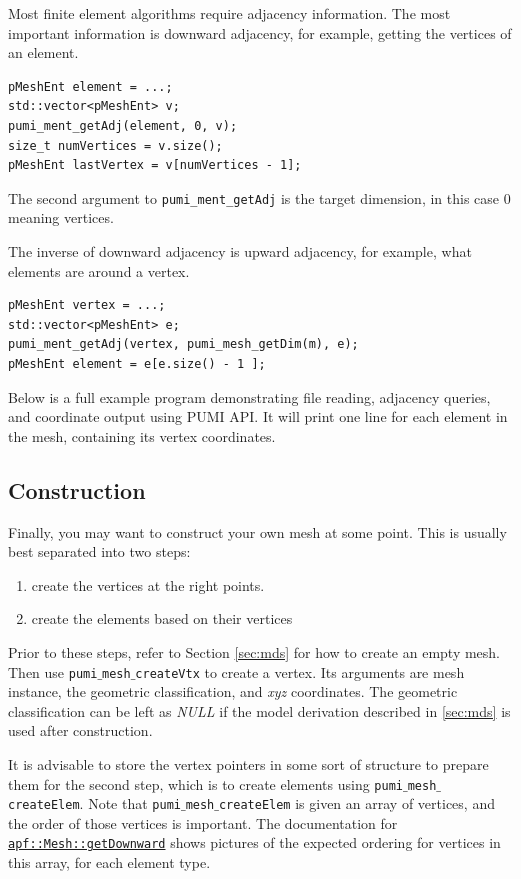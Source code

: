\documentclass{article}
\begin{document}
Most finite element algorithms require adjacency information.
The most important information is downward adjacency, for
example, getting the vertices of an element.

\begin{lstlisting}
pMeshEnt element = ...;
std::vector<pMeshEnt> v;
pumi_ment_getAdj(element, 0, v);
size_t numVertices = v.size();
pMeshEnt lastVertex = v[numVertices - 1];
\end{lstlisting}

The second argument to {\texttt{pumi\_ment\_getAdj}}
is the target dimension, in this case 0 meaning vertices.

The inverse of downward adjacency is upward adjacency,
for example, what elements are around a vertex.

\begin{lstlisting}
pMeshEnt vertex = ...;
std::vector<pMeshEnt> e;
pumi_ment_getAdj(vertex, pumi_mesh_getDim(m), e);
pMeshEnt element = e[e.size() - 1 ];
\end{lstlisting}

Below is a full example program demonstrating file reading,
adjacency queries, and coordinate output using PUMI API.
It will print one line for each element in the mesh,
containing its vertex coordinates.



\subsection{Construction}
\label{sec:gen}

Finally, you may want to construct your own mesh at
some point.
This is usually best separated into two steps:
\begin{enumerate}
\item create the vertices at the right points.
\item create the elements based on their vertices
\end{enumerate}

Prior to these steps, refer to Section \ref{sec:mds} for
how to create an empty mesh.
Then use \texttt{pumi$\_$mesh$\_$createVtx} to create a vertex.
Its arguments are mesh instance, the geometric classification, and \emph{xyz}
coordinates.
The geometric classification can be left as \emph{NULL} if the model derivation
described in \ref{sec:mds} is used after construction.

It is advisable to store the vertex pointers in some sort
of structure to prepare them for the second step,
which is to create elements using \texttt{pumi$\_$mesh$\_$createElem}.
Note that \texttt{pumi$\_$mesh$\_$createElem} is given an array
of vertices, and the order of those vertices is important.
The documentation for
\href{http://scorec.rpi.edu/~dibanez/core/classapf_1_1Mesh.html#ae9af2075129ffd4553092049d85b276b}{\texttt{apf::Mesh::getDownward}}
shows pictures of the expected ordering for vertices
in this array, for each element type.
\end{document}

